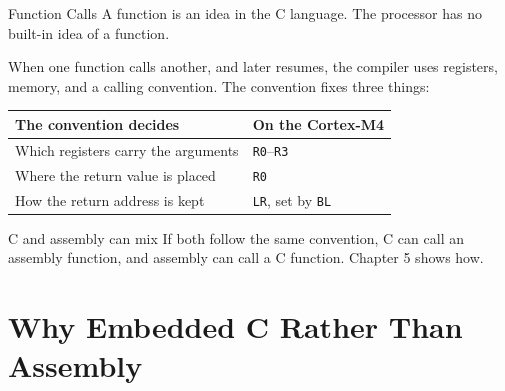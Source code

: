 \documentclass[9pt,aspectratio=169,xcolor=table]{beamer}
\begin{document}
\begin{frame}{Function Calls}
    \leavevmode
    A \alert{function} is an idea in the C language. The processor has no built-in idea of a function.

    \vspace{3mm}
    When one function calls another, and later resumes, the compiler uses registers, memory, and a \alert{calling convention}. The convention fixes three things:

    \vspace{1mm}
    \begin{center}
    {\small
    \striped
    \begin{tabular}{@{}l l@{}}
        \toprule
        \textbf{The convention decides} & \textbf{On the Cortex-M4} \\
        \midrule
        Which registers carry the arguments & \texttt{R0}--\texttt{R3} \\
        Where the return value is placed & \texttt{R0} \\
        How the return address is kept & \texttt{LR}, set by \texttt{BL} \\
        \bottomrule
    \end{tabular}}
    \end{center}

    \vspace{2mm}
    \begin{block}{C and assembly can mix}
        If both follow the same convention, C can call an assembly
        function, and assembly can call a C function. Chapter 5
        shows how.
    \end{block}
\end{frame}


\section{Why Embedded C Rather Than Assembly}
\end{document}
